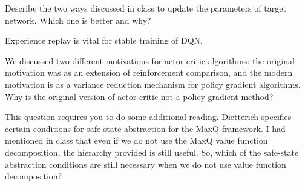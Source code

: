 \documentclass[solution,addpoints,12pt]{exam}
\begin{document}
\begin{questions}
\begin{itemize}
\begin{solution}
    \end{solution}
    \question [2] Describe the two ways discussed in class to update the parameters of target network. Which one is better and why?
    \begin{solution}
    
    \end{solution}
\end{itemize}

\question[4] Experience replay is vital for stable training of DQN.

\question[3] We discussed two different motivations for actor-critic algorithms: the original motivation was as an extension of reinforcement comparison, and the modern motivation is as a variance reduction mechanism for policy gradient algorithms. Why is the original version
of actor-critic not a policy gradient method?
\begin{solution}

\end{solution}


\question[4]
This question requires you to do some \href{https://arxiv.org/abs/cs/9905014}{additional reading}.  Dietterich specifies certain conditions for safe-state abstraction for the MaxQ framework.  I had mentioned in class that even if we do not use the MaxQ value function decomposition, the hierarchy provided is still useful.  So, which of the safe-state abstraction conditions are still necessary when we do not use value function decomposition?
\begin{solution}


\end{solution}
\end{questions}
\end{document}
